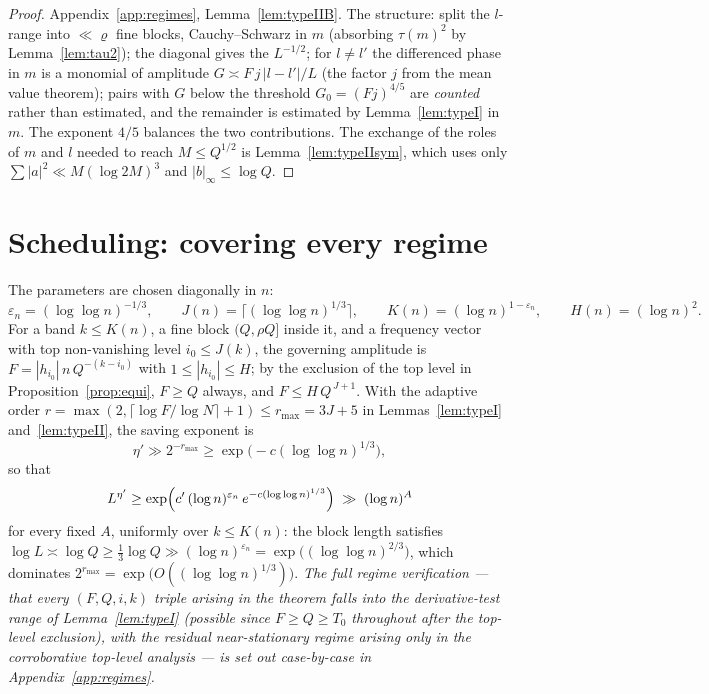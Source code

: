 \documentclass[11pt]{article}
\theoremstyle{definition}
\theoremstyle{plain}
\begin{document}
\begin{proof}
Appendix~\ref{app:regimes}, Lemma~\ref{lem:typeIIB}.  The structure: split
the $l$-range into $\ll\varrho$ fine blocks, Cauchy--Schwarz in $m$
(absorbing $\tau(m)^2$ by Lemma~\ref{lem:tau2}); the diagonal gives
the $L^{-1/2}$; for $l\ne l'$ the differenced phase in $m$ is a
monomial of amplitude $G\asymp F\,j\,|l-l'|/L$ (the factor $j$ from the
mean value theorem); pairs with $G$ below the threshold
$G_0=(Fj)^{4/5}$ are \emph{counted} rather than estimated, and the
remainder is estimated by Lemma~\ref{lem:typeI} in $m$.  The exponent
$4/5$ balances the two contributions.  The exchange of the roles of $m$
and $l$ needed to reach $M\le Q^{1/2}$ is Lemma~\ref{lem:typeIIsym},
which uses only $\sum|a|^2\ll M(\log2M)^3$ and $|b|_\infty\le\log Q$.
\end{proof}

\section{Scheduling: covering every regime}\label{sec:schedule}

The parameters are chosen diagonally in $n$:
\[
\varepsilon_n=(\log\log n)^{-1/3},\qquad
J(n)=\bigl\lceil(\log\log n)^{1/3}\bigr\rceil,\qquad
K(n)=(\log n)^{1-\varepsilon_n},\qquad
H(n)=(\log n)^{2} .
\]
For a band $k\le K(n)$, a fine block $(Q,\rho Q]$ inside it, and a
frequency vector with top non-vanishing level $i_0\le J(k)$, the
governing amplitude is $F=|h_{i_0}|\,n\,Q^{-(k-i_0)}$ with
$1\le|h_{i_0}|\le H$; by the exclusion of the top level in
Proposition~\ref{prop:equi}, $F\ge Q$ always, and $F\le H\,Q^{\,J+1}$.
With the adaptive order $r=\max(2,\lceil\log F/\log N\rceil+1)\le
r_{\max}=3J+5$ in Lemmas~\ref{lem:typeI} and~\ref{lem:typeII}, the
saving exponent is
\[
\eta'\gg 2^{-r_{\max}}\ge\exp\bigl(-c(\log\log n)^{1/3}\bigr),
\]
so that
\[
L^{\eta'}\ge\exp\Bigl(c'\,(\log n)^{\varepsilon_n}\,
e^{-c(\log\log n)^{1/3}}\Bigr)\;\gg\;(\log n)^{A}
\]
for every fixed $A$, uniformly over $k\le K(n)$: the block length
satisfies $\log L\asymp\log Q\ge\tfrac13\log Q\gg(\log n)^{\varepsilon_n}
=\exp\bigl((\log\log n)^{2/3}\bigr)$, which dominates
$2^{r_{\max}}=\exp\bigl(O((\log\log n)^{1/3})\bigr)$.  \emph{The full
regime verification --- that every $(F,Q,i,k)$ triple arising in the
theorem falls into the derivative-test range of Lemma~\ref{lem:typeI}
(possible since $F\ge Q\ge T_0$ throughout after the top-level
exclusion), with the residual near-stationary regime arising only in
the corroborative top-level analysis --- is set out case-by-case in
Appendix~\ref{app:regimes}.}
\end{document}
